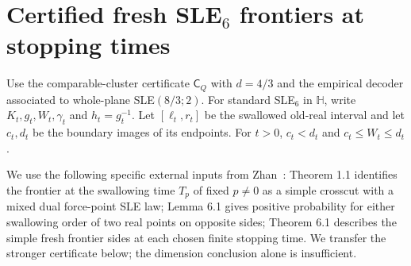 \section{Certified fresh SLE$_6$ frontiers at stopping times}
\label{sec:frontier-certificate-bridge}

Use the comparable-cluster certificate $\mathsf C_Q$ with $d=4/3$
and the empirical decoder associated to whole-plane SLE$(8/3;2)$.
For standard SLE$_6$ in $\mathbb H$, write $K_t,g_t,W_t,\gamma_t$
and $h_t=g_t^{-1}$. Let $[\ell_t,r_t]$ be the swallowed old-real
interval and let $c_t,d_t$ be the boundary images of its endpoints.
For $t>0$, $c_t<d_t$ and $c_t\le W_t\le d_t$.

We use the following specific external inputs from
Zhan~\cite{zhan-duality-ii}: Theorem 1.1 identifies the frontier at
the swallowing time $T_p$ of fixed $p\ne0$ as a simple crosscut with
a mixed dual force-point SLE law; Lemma 6.1 gives positive probability
for either swallowing order of two real points on opposite sides;
Theorem 6.1 describes the simple fresh frontier sides at each chosen
finite stopping time. We transfer the stronger certificate below;
the dimension conclusion alone is insufficient.

